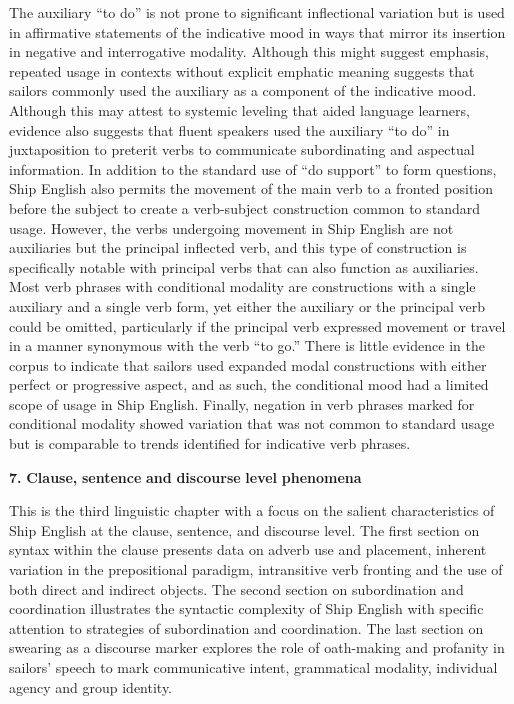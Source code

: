 The auxiliary “to do” is not prone to significant inflectional variation but is used in affirmative statements of the indicative mood in ways that mirror its insertion in negative and interrogative modality. Although this might suggest emphasis, repeated usage in contexts without explicit emphatic meaning suggests that sailors commonly used the auxiliary as a component of the indicative mood. Although this may attest to systemic leveling that aided language learners, evidence also suggests that fluent speakers used the auxiliary “to do” in juxtaposition to preterit verbs to communicate subordinating and aspectual information. In addition to the standard use of “do support” to form questions, Ship English also permits the movement of the main verb to a fronted position before the subject to create a verb-subject construction common to standard usage. However, the verbs undergoing movement in Ship English are not auxiliaries but the principal inflected verb, and this type of construction is specifically notable with principal verbs that can also function as auxiliaries. Most verb phrases with conditional modality are constructions with a single auxiliary and a single verb form, yet either the auxiliary or the principal verb could be omitted, particularly if the principal verb expressed movement or travel in a manner synonymous with the verb “to go.” There is little evidence in the corpus to indicate that sailors used expanded modal constructions with either perfect or progressive aspect, and as such, the conditional mood had a limited scope of usage in Ship English. Finally, negation in verb phrases marked for conditional modality showed variation that was not common to standard usage but is comparable to trends identified for indicative verb phrases. 

\textbf{7.} \textbf{Clause,} \textbf{sentence} \textbf{and} \textbf{discourse} \textbf{level} \textbf{phenomena}

This is the third linguistic chapter with a focus on the salient characteristics of Ship English at the clause, sentence, and discourse level. The first section on syntax within the clause presents data on adverb use and placement, inherent variation in the prepositional paradigm, intransitive verb fronting and the use of both direct and indirect objects. The second section on subordination and coordination illustrates the syntactic complexity of Ship English with specific attention to strategies of subordination and coordination. The last section on swearing as a discourse marker explores the role of oath-making and profanity in sailors’ speech to mark communicative intent, grammatical modality, individual agency and group identity. 

